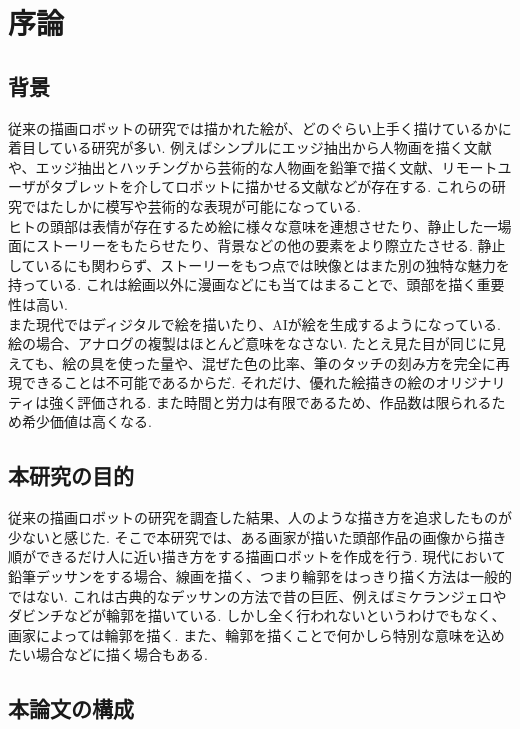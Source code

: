 \chapter{序論}
  \label{chap:intro}
  \section{背景}
    \label{sec:background}
	従来の描画ロボットの研究では描かれた絵が、どのぐらい上手く描けているかに着目している研究が多い.
    例えばシンプルにエッジ抽出から人物画を描く文献\cite{1}や、エッジ抽出とハッチングから芸術的な人物画を鉛筆で描く文献\cite{2}、リモートユーザがタブレットを介してロボットに描かせる文献\cite{3}などが存在する.
	これらの研究ではたしかに模写や芸術的な表現が可能になっている.
	\\
	\hspace{10pt}
	ヒトの頭部は表情が存在するため絵に様々な意味を連想させたり、静止した一場面にストーリーをもたらせたり、背景などの他の要素をより際立たさせる.
	静止しているにも関わらず、ストーリーをもつ点では映像とはまた別の独特な魅力を持っている.
	これは絵画以外に漫画などにも当てはまることで、頭部を描く重要性は高い.\\
	\hspace{10pt}また現代ではディジタルで絵を描いたり、AIが絵を生成するようになっている.
	絵の場合、アナログの複製はほとんど意味をなさない. 
	たとえ見た目が同じに見えても、絵の具を使った量や、混ぜた色の比率、筆のタッチの刻み方を完全に再現できることは不可能であるからだ.
	それだけ、優れた絵描きの絵のオリジナリティは強く評価される.
	また時間と労力は有限であるため、作品数は限られるため希少価値は高くなる.



  \section{本研究の目的}
    \label{sec:target}
	従来の描画ロボットの研究を調査した結果、人のような描き方を追求したものが少ないと感じた.
	そこで本研究では、ある画家が描いた頭部作品の画像から描き順ができるだけ人に近い描き方をする描画ロボットを作成を行う.
	\hspace{10pt}
   現代において鉛筆デッサンをする場合、線画を描く、つまり輪郭をはっきり描く方法は一般的ではない.
	これは古典的なデッサンの方法で昔の巨匠、例えばミケランジェロやダビンチなどが輪郭を描いている.
	しかし全く行われないというわけでもなく、画家によっては輪郭を描く.
	また、輪郭を描くことで何かしら特別な意味を込めたい場合などに描く場合もある. 
	
	\section{本論文の構成}
    \label{sec:construction_of_this_paper}
    
